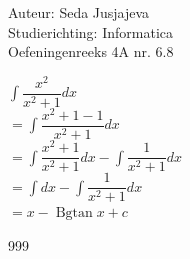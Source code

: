 \documentclass[a4paper]{article}
\newcommand{\integral}{\displaystyle\int}
\begin{document}
\noindent \large Auteur: Seda Jusjajeva\\
\noindent \large Studierichting: Informatica\\
\noindent \large Oefeningenreeks 4A nr. 6.8 \\

\medskip

\normalsize


$\integral\dfrac{x^2}{x^2 + 1}dx$ \\

$= \integral\dfrac{x^2 + 1 - 1}{x^2 + 1}dx$ \\

$= \integral\dfrac{x^2 + 1}{x^2 + 1}dx - \integral\dfrac{1}{x^2 + 1}dx$ \\

$= \integral dx - \integral\dfrac{1}{x^2 + 1}dx$ \\

$= x - \operatorname{Bgtan}x + c$

\begin{thebibliography}{999}
\end{thebibliography}
\end{document}
